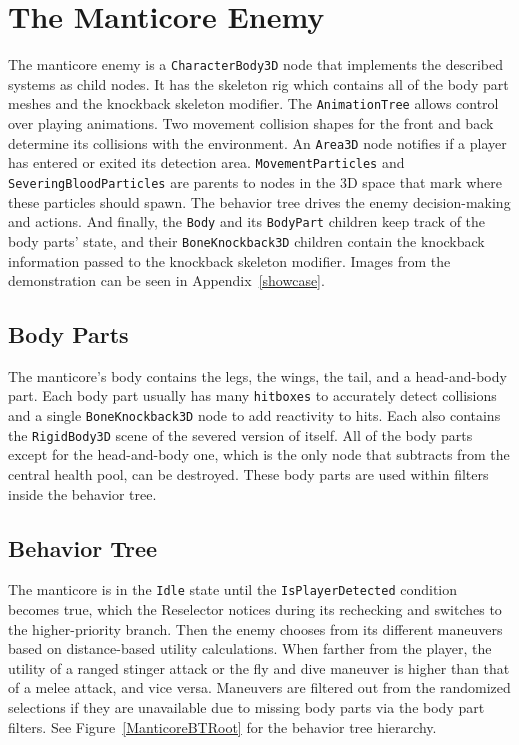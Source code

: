 \section{The Manticore Enemy}
The manticore enemy is a \texttt{CharacterBody3D} node that implements the described systems as child nodes. It has the skeleton rig which contains all of the body part meshes and the knockback skeleton modifier. The \texttt{AnimationTree} allows control over playing animations. Two movement collision shapes for the front and back determine its collisions with the environment. An \texttt{Area3D} node notifies if a player has entered or exited its detection area. \texttt{MovementParticles} and \texttt{SeveringBloodParticles} are parents to nodes in the 3D space that mark where these particles should spawn. The behavior tree drives the enemy decision-making and actions. And finally, the \texttt{Body} and its \texttt{BodyPart} children keep track of the body parts' state, and their \texttt{BoneKnockback3D} children contain the knockback information passed to the knockback skeleton modifier. Images from the demonstration can be seen in Appendix~\ref{showcase}.

\subsection{Body Parts}
The manticore's body contains the legs, the wings, the tail, and a head-and-body part. Each body part usually has many \texttt{hitboxes} to accurately detect collisions and a single \texttt{BoneKnockback3D} node to add reactivity to hits. Each also contains the \texttt{RigidBody3D} scene of the severed version of itself. All of the body parts except for the head-and-body one, which is the only node that subtracts from the central health pool, can be destroyed. These body parts are used within filters inside the behavior tree.

\subsection{Behavior Tree}
The manticore is in the \texttt{Idle} state until the \texttt{IsPlayerDetected} condition becomes true, which the Reselector notices during its rechecking and switches to the higher-priority branch. Then the enemy chooses from its different maneuvers based on distance-based utility calculations. When farther from the player, the utility of a ranged stinger attack or the fly and dive maneuver is higher than that of a melee attack, and vice versa. Maneuvers are filtered out from the randomized selections if they are unavailable due to missing body parts via the body part filters. See Figure~\ref{ManticoreBTRoot} for the behavior tree hierarchy.

